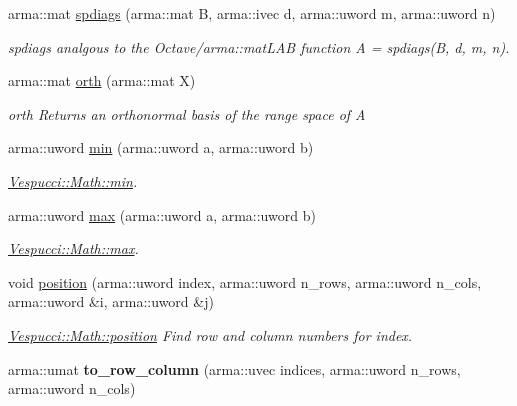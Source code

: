 \begin{DoxyCompactItemize}
\item 
arma\+::mat \hyperlink{namespace_vespucci_1_1_math_a3fecba29812be11a79fe7d9a2a88964e}{spdiags} (arma\+::mat B, arma\+::ivec d, arma\+::uword m, arma\+::uword n)
\begin{DoxyCompactList}\small\item\em spdiags analgous to the Octave/arma\+::mat\+L\+A\+B function A = spdiags(\+B, d, m, n). \end{DoxyCompactList}\item 
arma\+::mat \hyperlink{namespace_vespucci_1_1_math_a9ae51093bbdcdae2b8e6772d8951889c}{orth} (arma\+::mat X)
\begin{DoxyCompactList}\small\item\em orth Returns an orthonormal basis of the range space of A \end{DoxyCompactList}\item 
arma\+::uword \hyperlink{namespace_vespucci_1_1_math_a884dc00603c6aed8e2ee23988c429c64}{min} (arma\+::uword a, arma\+::uword b)
\begin{DoxyCompactList}\small\item\em \hyperlink{namespace_vespucci_1_1_math_a884dc00603c6aed8e2ee23988c429c64}{Vespucci\+::\+Math\+::min}. \end{DoxyCompactList}\item 
arma\+::uword \hyperlink{namespace_vespucci_1_1_math_a3d8f536b4465a4bacce89a51e3854daf}{max} (arma\+::uword a, arma\+::uword b)
\begin{DoxyCompactList}\small\item\em \hyperlink{namespace_vespucci_1_1_math_a3d8f536b4465a4bacce89a51e3854daf}{Vespucci\+::\+Math\+::max}. \end{DoxyCompactList}\item 
void \hyperlink{namespace_vespucci_1_1_math_a62f5e835cad1e15513494a5a48e028ae}{position} (arma\+::uword index, arma\+::uword n\+\_\+rows, arma\+::uword n\+\_\+cols, arma\+::uword \&i, arma\+::uword \&j)
\begin{DoxyCompactList}\small\item\em \hyperlink{namespace_vespucci_1_1_math_a62f5e835cad1e15513494a5a48e028ae}{Vespucci\+::\+Math\+::position} Find row and column numbers for index. \end{DoxyCompactList}\item 
\hypertarget{namespace_vespucci_1_1_math_a114f5bdc75f1c911ccf1d6e8652d6cfa}{arma\+::umat {\bfseries to\+\_\+row\+\_\+column} (arma\+::uvec indices, arma\+::uword n\+\_\+rows, arma\+::uword n\+\_\+cols)}\label{namespace_vespucci_1_1_math_a114f5bdc75f1c911ccf1d6e8652d6cfa}


\end{DoxyCompactItemize}
